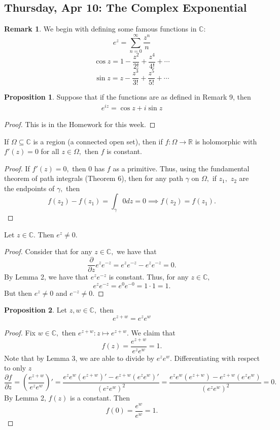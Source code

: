\documentclass[10pt, oneside]{article}
\newcommand{\bbR}{\mathbb{R}}
\newcommand{\bbC}{\mathbb{C}}
\theoremstyle{definition}
\newtheorem{prop}{Proposition}
\newtheorem{rem}{Remark}
\begin{document}
\subsection{Thursday, Apr 10: The Complex Exponential}
\begin{rem}
    We begin with defining some famous functions in $\bbC$:
    \[e^z = \sum_{n=0}^\infty \frac{z^n}{n}\]
    \[\cos z = 1 - \frac{z^2}{2!} + \frac{z^4}{4!} + \cdots\]
    \[\sin z = z - \frac{z^3}{3!} + \frac{z^5}{5!} + \cdots\]
\end{rem}
\begin{prop}
    Suppose that if the functions are as defined in Remark 9, then 
    \begin{align}
        e^{iz} = \cos z + i\sin z
    \end{align}
\end{prop}
\begin{proof}
    This is in the Homework for this week.
\end{proof}
\begin{lemma}
    If $\Omega\subseteq \bbC$ is a region (a connected open set), then if $f: \Omega \to \bbR$ is holomorphic with $f'(z) = 0$ for all $z\in \Omega,$ then $f$ is constant.
\end{lemma}
\begin{proof}
    If $f'(z) = 0,$ then $0$ has $f$ as a primitive. Thus, using the fundamental theorem of path integrals (Theorem 6), then for any path $\gamma$ on $\Omega,$ if $z_1,$ $z_2$ are the endpoints of $\gamma,$ then
    \[f(z_2) - f(z_1) = \int_\gamma 0 dz = 0 \implies f(z_2) = f(z_1).\]
\end{proof}
\begin{lemma}
    Let $z \in \bbC.$ Then $e^z \neq 0.$
\end{lemma}
\begin{proof}
Consider that for any $z\in \bbC,$ we have that
    \[\frac{\partial}{\partial z}e^ze^{-z} = e^ze^{-z} - e^ze^{-z} = 0.\] By Lemma 2, we have that $e^ze^{-z}$ is constant. Thus, for any $z\in \bbC,$
    \[e^ze^{-z} = e^0 e^{-0} = 1 \cdot 1 = 1.\] But then $e^z \neq 0$ and $e^{-z}\neq 0.$ 
\end{proof}
\begin{prop}
Let $z,w \in \bbC,$ then
    \[e^{z + w} = e^z e^w\]
\end{prop}
\begin{proof}
    Fix $w\in \bbC,$ then $e^{z + w}: z\mapsto e^{z + w}.$ We claim that 
    \[f(z)= \frac{e^{z + w}}{e^ze^w}= 1.\] Note that by Lemma 3, we are able to divide by $e^ze^w.$ Differentiating with respect to only $z$ 
    \[\frac{\partial f}{\partial z} = (\frac{e^{z + w}}{e^ze^w})' = \frac{e^ze^w(e^{z + w})' - e^{z + w}(e^{z}e^w)'}{(e^z e^w)^2} = \frac{e^ze^w(e^{z + w}) - e^{z + w}(e^{z}e^w)}{(e^z e^w)^2} = 0.\] By Lemma 2, $f(z)$ is a constant. Then 
    \[f(0) = \frac{e^w}{e^w} = 1.\] 
\end{proof}
\end{document}

